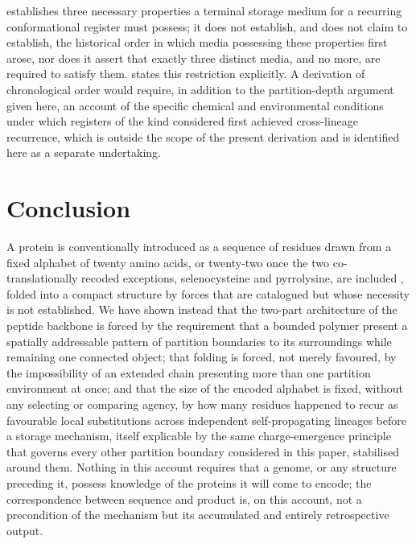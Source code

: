 \documentclass[11pt,twocolumn,a4paper]{article}
\theoremstyle{plain}
\theoremstyle{definition}
\theoremstyle{remark}
\begin{document}
 establishes three necessary properties a terminal
storage medium for a recurring conformational register must possess; it
does not establish, and does not claim to establish, the historical order
in which media possessing these properties first arose, nor does it
assert that exactly three distinct media, and no more, are required to
satisfy them.  states this restriction
explicitly. A derivation of chronological order would require, in
addition to the partition-depth argument given here, an account of the
specific chemical and environmental conditions under which registers of
the kind considered first achieved cross-lineage recurrence, which is
outside the scope of the present derivation and is identified here as a
separate undertaking.

\section{Conclusion}
\label{sec:conclusion}

A protein is conventionally introduced as a sequence of residues drawn from
a fixed alphabet of twenty amino acids, or twenty-two once the two
co-translationally recoded exceptions, selenocysteine and pyrrolysine, are
included \citep{bock1991,srinivasan2002}, folded into a compact structure
by forces that are catalogued but whose necessity is not established. We have shown
instead that the two-part architecture of the peptide backbone is forced by
the requirement that a bounded polymer present a spatially addressable
pattern of partition boundaries to its surroundings while remaining one
connected object; that folding is forced, not merely favoured, by the
impossibility of an extended chain presenting more than one partition
environment at once; and that the size of the encoded alphabet is fixed,
without any selecting or comparing agency, by how many residues happened to
recur as favourable local substitutions across independent self-propagating
lineages before a storage mechanism, itself explicable by the same
charge-emergence principle that governs every other partition boundary
considered in this paper, stabilised around them. Nothing in this account
requires that a genome, or any structure preceding it, possess knowledge of
the proteins it will come to encode; the correspondence between sequence and
product is, on this account, not a precondition of the mechanism but its
accumulated and entirely retrospective output.



\end{document}
